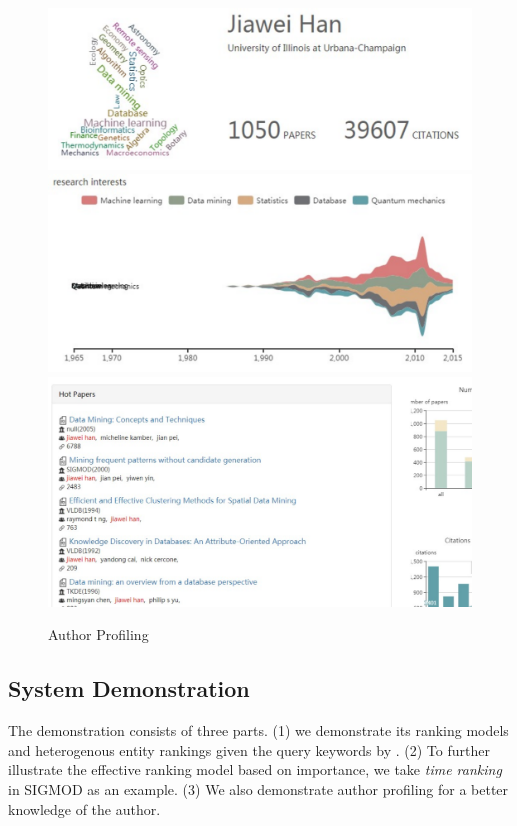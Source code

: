 \begin{figure}
\centering
\includegraphics[width=\columnwidth]{hjwAvatar.pdf}
\includegraphics[width=\columnwidth]{hjwInterest.pdf}
\includegraphics[width=\columnwidth]{hjwPapers.pdf}
\caption{Author Profiling}
\label{fig:hjwProfile}
\vspace{-3ex}
\end{figure}



\subsection{System Demonstration}
\par The demonstration consists of three parts. (1) we demonstrate its ranking models and heterogenous entity rankings given the query keywords by \oursystem. (2) To further illustrate the effective ranking model based on importance, we take {\em time ranking} in SIGMOD as an example. (3) We also demonstrate author profiling for a better knowledge of the author.


